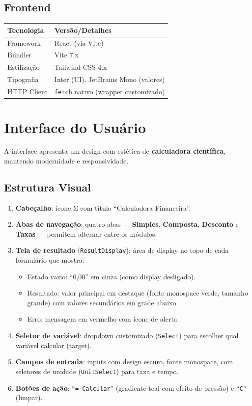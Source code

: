 \documentclass[12pt,a4paper]{article}
\begin{document}
\subsection{Frontend}

\begin{center}
\begin{tabular}{ll}
  \toprule
  \textbf{Tecnologia} & \textbf{Versão/Detalhes} \\
  \midrule
  Framework     & React (via Vite) \\
  Bundler       & Vite 7.x \\
  Estilização   & Tailwind CSS 4.x \\
  Tipografia    & Inter (UI), JetBrains Mono (valores) \\
  HTTP Client   & \texttt{fetch} nativo (wrapper customizado) \\
  \bottomrule
\end{tabular}
\end{center}

\section{Interface do Usuário}
\label{sec:ui}

A interface apresenta um design com estética de \textbf{calculadora científica}, mantendo modernidade e responsividade.

\subsection{Estrutura Visual}

\begin{enumerate}
  \item \textbf{Cabeçalho}: ícone Σ com título ``Calculadora Financeira''.
  \item \textbf{Abas de navegação}: quatro abas --- \textbf{Simples}, \textbf{Composta}, \textbf{Desconto} e \textbf{Taxas} --- permitem alternar entre os módulos.
  \item \textbf{Tela de resultado} (\texttt{ResultDisplay}): área de display no topo de cada formulário que mostra:
  \begin{itemize}
    \item Estado vazio: ``0,00'' em cinza (como display desligado).
    \item Resultado: valor principal em destaque (fonte monospace verde, tamanho grande) com valores secundários em grade abaixo.
    \item Erro: mensagem em vermelho com ícone de alerta.
  \end{itemize}
  \item \textbf{Seletor de variável}: dropdown customizado (\texttt{Select}) para escolher qual variável calcular (target).
  \item \textbf{Campos de entrada}: inputs com design escuro, fonte monospace, com seletores de unidade (\texttt{UnitSelect}) para taxa e tempo.
  \item \textbf{Botões de ação}: ``\texttt{= Calcular}'' (gradiente teal com efeito de pressão) e ``\texttt{C}'' (limpar).
\end{enumerate}
\end{document}
